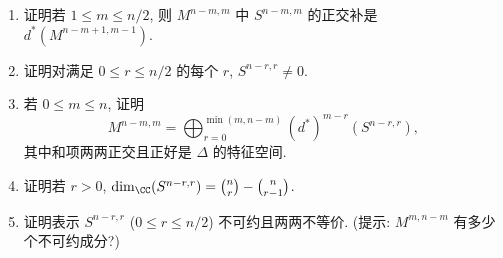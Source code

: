 \begin{exercise}[对称幂的分解]
\begin{enumerate}
\item[(h)] 证明若 $1 \leq m \leq n/2$, 则 $M^{n-m,m}$ 中 $S^{n-m,m}$ 的正交补是 $d^*(M^{n-m+1,m-1})$.
\item[(i)] 证明对满足 $0 \leq r \leq n/2$ 的每个 $r$, $S^{n-r,r} \neq 0$.
\item[(j)] 若 $0 \leq m \leq n$, 证明
\[
M^{n-m,m} = \bigoplus_{r=0}^{\min(m,n-m)}(d^*)^{m-r}(S^{n-r,r}),
\]
其中和项两两正交且正好是 $\Delta$ 的特征空间.
\item[(k)] 证明若 $r > 0$, $\dim_{\CC}(S^{n-r,r}) = \binom{n}{r} - \binom{n}{r-1}$.
\item[(l)] 证明表示 $S^{n-r,r}$ ($0 \leq r \leq n/2$) 不可约且两两不等价. (提示: $M^{m,n-m}$ 有多少个不可约成分?)
\end{enumerate}
\end{exercise}

